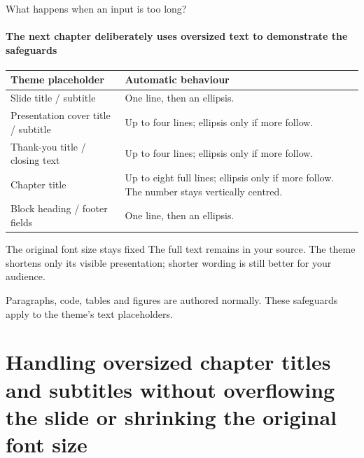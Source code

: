 \documentclass[aspectratio=169,10pt]{beamer}
\begin{document}
\begin{frame}{What happens when an input is too long?}
  \framesubtitle{The next chapter deliberately uses oversized text to demonstrate the safeguards}
  \small
  \begin{tabular}{@{}p{}p{}@{}}
    \toprule
    \textbf{Theme placeholder} & \textbf{Automatic behaviour}\\
    \midrule
    Slide title / subtitle & One line, then an ellipsis.\\[2mm]
    Presentation cover title / subtitle & Up to four lines; ellipsis only if more follow.\\[2mm]
    Thank-you title / closing text & Up to four lines; ellipsis only if more follow.\\[2mm]
    Chapter title & Up to eight full lines; ellipsis only if more follow. The number stays vertically centred.\\[2mm]
    Block heading / footer fields & One line, then an ellipsis.\\
    \bottomrule
  \end{tabular}
  \medskip
  \begin{alertblock}{The original font size stays fixed}
    The full text remains in your source. The theme shortens only its visible presentation; shorter wording is still better for your audience.
  \end{alertblock}
  \textcolor{DASEslate}{\scriptsize Paragraphs, code, tables and figures are authored normally. These safeguards apply to the theme's text placeholders.}
\end{frame}

\section{Handling oversized chapter titles and subtitles without overflowing the slide or shrinking the original font size}
\end{document}
